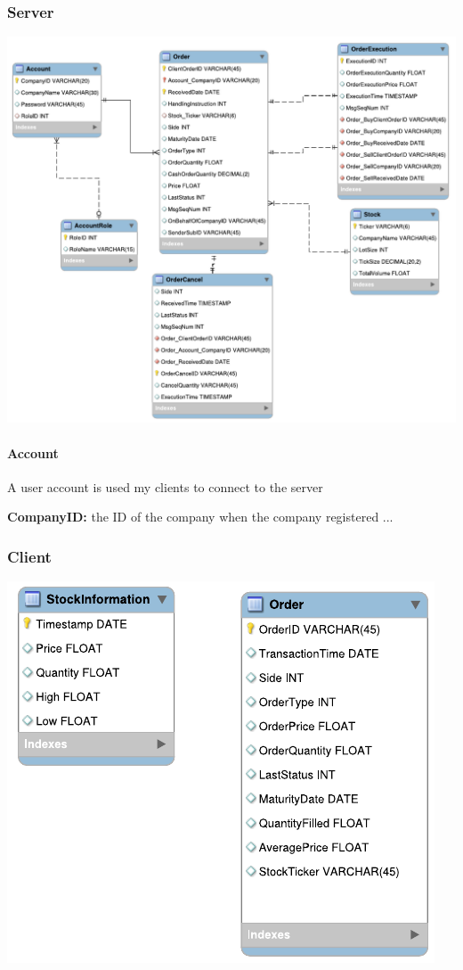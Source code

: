 \documentclass[a4paper, 11pt]{article}
\begin{document}
\subsubsection*{Server}
\includegraphics{../diagrams/server_database.pdf}
\paragraph*{Account}
A user account is used my clients to connect to the server

\textbf{CompanyID:} the ID of the company when the company registered
...
\subsubsection*{Client}
\includegraphics{../diagrams/client_database.pdf}
\end{document}
